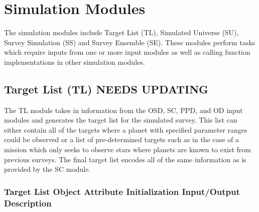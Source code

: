 \documentclass[cleanfoot]{asme2ej}
\begin{document}

\section{Simulation Modules}
The simulation modules include Target List (TL), Simulated Universe (SU), Survey Simulation (SS) and Survey Ensemble (SE). These modules perform tasks which require inputs from one or more input modules as well as calling function implementations in other simulation modules.


\subsection{Target List (TL) NEEDS UPDATING}
The TL module takes in information from the OSD, SC, PPD, and OD input modules and generates the target list for the simulated survey.  This list can either contain all of the targets where a planet with specified parameter ranges could be observed or a list of pre-determined targets such as in the case of a mission which only seeks to observe stars where planets are known to exist from previous surveys.  The final target list encodes all of the same information as is provided by the SC module.

\label{sec:targetlist}
\subsubsection{Target List Object Attribute Initialization Input/Output Description}
\end{document}

